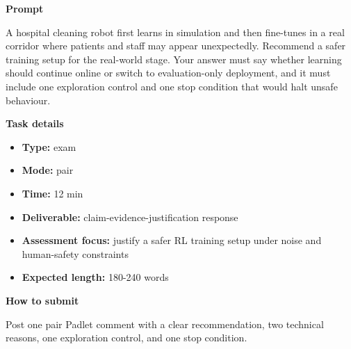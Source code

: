\documentclass[11pt]{article}
\begin{document}
\begin{tcolorbox}[colback=white,colframe=MidnightBlue,title={Q6 Exam-Style Constructed Response},fonttitle=\bfseries,breakable]
\begin{center}
\end{center}

{\large\bfseries\color{MidnightBlue} Prompt}\par\medskip
A hospital cleaning robot first learns in simulation and then fine-tunes in a real corridor where patients and staff may appear unexpectedly. Recommend a safer training setup for the real-world stage. Your answer must say whether learning should continue online or switch to evaluation-only deployment, and it must include one exploration control and one stop condition that would halt unsafe behaviour.

{\large\bfseries\color{MidnightBlue} Task details}\par\medskip
\begin{itemize}\item \textbf{Type:} exam
\item \textbf{Mode:} pair
\item \textbf{Time:} 12 min
\item \textbf{Deliverable:} claim-evidence-justification response
\item \textbf{Assessment focus:} justify a safer RL training setup under noise and human-safety constraints
\item \textbf{Expected length:} 180-240 words\end{itemize}

{\large\bfseries\color{MidnightBlue} How to submit}\par\medskip
Post one pair Padlet comment with a clear recommendation, two technical reasons, one exploration control, and one stop condition.


\end{tcolorbox}
\end{document}
